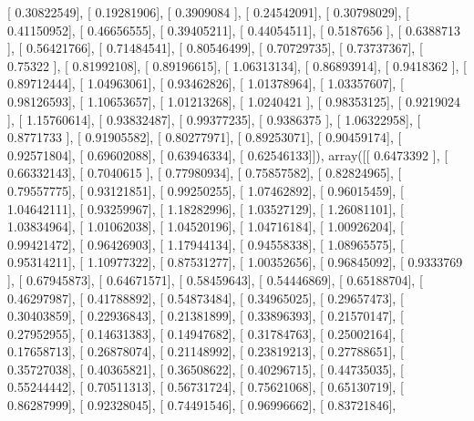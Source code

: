 \documentclass{article}
\begin{document}
       [ 0.30822549],
       [ 0.19281906],
       [ 0.3909084 ],
       [ 0.24542091],
       [ 0.30798029],
       [ 0.41150952],
       [ 0.46656555],
       [ 0.39405211],
       [ 0.44054511],
       [ 0.5187656 ],
       [ 0.6388713 ],
       [ 0.56421766],
       [ 0.71484541],
       [ 0.80546499],
       [ 0.70729735],
       [ 0.73737367],
       [ 0.75322   ],
       [ 0.81992108],
       [ 0.89196615],
       [ 1.06313134],
       [ 0.86893914],
       [ 0.9418362 ],
       [ 0.89712444],
       [ 1.04963061],
       [ 0.93462826],
       [ 1.01378964],
       [ 1.03357607],
       [ 0.98126593],
       [ 1.10653657],
       [ 1.01213268],
       [ 1.0240421 ],
       [ 0.98353125],
       [ 0.9219024 ],
       [ 1.15760614],
       [ 0.93832487],
       [ 0.99377235],
       [ 0.9386375 ],
       [ 1.06322958],
       [ 0.8771733 ],
       [ 0.91905582],
       [ 0.80277971],
       [ 0.89253071],
       [ 0.90459174],
       [ 0.92571804],
       [ 0.69602088],
       [ 0.63946334],
       [ 0.62546133]]), array([[ 0.6473392 ],
       [ 0.66332143],
       [ 0.7040615 ],
       [ 0.77980934],
       [ 0.75857582],
       [ 0.82824965],
       [ 0.79557775],
       [ 0.93121851],
       [ 0.99250255],
       [ 1.07462892],
       [ 0.96015459],
       [ 1.04642111],
       [ 0.93259967],
       [ 1.18282996],
       [ 1.03527129],
       [ 1.26081101],
       [ 1.03834964],
       [ 1.01062038],
       [ 1.04520196],
       [ 1.04716184],
       [ 1.00926204],
       [ 0.99421472],
       [ 0.96426903],
       [ 1.17944134],
       [ 0.94558338],
       [ 1.08965575],
       [ 0.95314211],
       [ 1.10977322],
       [ 0.87531277],
       [ 1.00352656],
       [ 0.96845092],
       [ 0.9333769 ],
       [ 0.67945873],
       [ 0.64671571],
       [ 0.58459643],
       [ 0.54446869],
       [ 0.65188704],
       [ 0.46297987],
       [ 0.41788892],
       [ 0.54873484],
       [ 0.34965025],
       [ 0.29657473],
       [ 0.30403859],
       [ 0.22936843],
       [ 0.21381899],
       [ 0.33896393],
       [ 0.21570147],
       [ 0.27952955],
       [ 0.14631383],
       [ 0.14947682],
       [ 0.31784763],
       [ 0.25002164],
       [ 0.17658713],
       [ 0.26878074],
       [ 0.21148992],
       [ 0.23819213],
       [ 0.27788651],
       [ 0.35727038],
       [ 0.40365821],
       [ 0.36508622],
       [ 0.40296715],
       [ 0.44735035],
       [ 0.55244442],
       [ 0.70511313],
       [ 0.56731724],
       [ 0.75621068],
       [ 0.65130719],
       [ 0.86287999],
       [ 0.92328045],
       [ 0.74491546],
       [ 0.96996662],
       [ 0.83721846],
\end{document}
